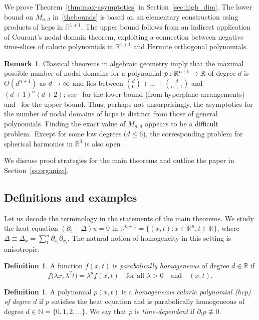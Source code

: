 \documentclass[10pt]{amsart}
\theoremstyle{definition}\newtheorem{defi}[theo]{Definition}\newtheorem{rema}[theo]{Remark}\newtheorem{exam}[theo]{Example}\newtheorem{exem}[theo]{Example}\newtheorem{nota}[theo]{Notation}
\newcommand{\N}{\mathbb{N}}
\newcommand{\R}{\mathbb{R}}
\renewcommand*{\to}{\mathchoice{\longrightarrow}{\rightarrow}{\rightarrow}{\rightarrow}}
\begin{document}
We prove Theorem~\ref{thm:max-asymptotics} in Section~\ref{sec:high_dim}. The lower bound on $M_{n,d}$ in~\eqref{thebounds} is based on an elementary construction using products of hcps in $\R^{1+1}$. The upper bound follows from an indirect application of Courant's nodal domain theorem, exploiting a connection between negative time-slices of caloric polynomials in $\R^{1+1}$ and Hermite orthogonal polynomials.

\begin{rema}
Classical theorems in algebraic geometry imply that the maximal {possible} number of nodal domains {for a} polynomial $p:\R^{n+1}\to\R$ of degree $d$ is $\Theta(d^{n+1})$ as $d\to\infty$ and lies between $\binom{d}{0}+\dots+\binom{d}{n+1}$ and $(d+1)^n(d+2)$; see~\cite[Proposition~2.4]{stanley-parkcity} for the lower bound (from hyperplane arrangements) and~\cite[Theorem~3]{M64} for the upper bound. Thus, perhaps not unsurprisingly, the {asymptotics for the number of nodal domains of }hcps is distinct from those of general polynomials. Finding the exact value of $M_{n,d}$ appears to be a difficult problem.~Except for some low degrees ($d\leq 6$), the corresponding problem for spherical harmonics in $\R^3$ is also open~\cite{Leydold96}.
\end{rema}

We discuss proof strategies for the main theorems and outline the paper in Section~\ref{ss:organize}.

\subsection{Definitions and examples}\label{ss:defs}

Let us decode the terminology in the statements of the main theorems. We study the heat equation $(\partial_t - \Delta) u = 0$ in $\R^{n+1} = \{ (x,t) : x \in \R^n, t \in \R \}$, where $\Delta\equiv \Delta_x=\sum_1^n \partial_{x_i}\partial_{x_i}$. The natural notion of homogeneity in this setting is anisotropic.

\begin{defi}
A function $f(x,t)$ is \emph{parabolically homogeneous} of degree $d \in \R $ if
\begin{equation}
f\bigl(\lambda x, \lambda^2 t\bigr) = \lambda^d f(x,t)\quad\text{for all }\lambda > 0\quad\text{and}\quad(x,t).
\end{equation}
\end{defi}

\begin{defi}
A polynomial $p(x,t)$ is a \emph{homogeneous caloric polynomial (hcp) of degree $d$} if $p$ satisfies the heat equation and is parabolically homogeneous{} of degree $d \in \N=\{0,1,2,\dots\}$. We say that $p$ is \emph{time-dependent} if $\partial_t p \not\equiv 0$.
\end{defi}
\end{document}
